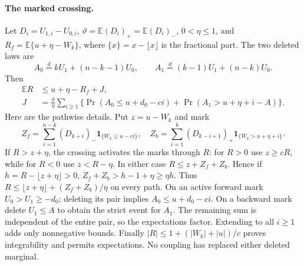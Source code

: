 \paragraph{The marked crossing.}
Let $D_i=U_{1,i}-U_{0,i}$, $\vartheta=\mathbb E(D_i)_+=\mathbb E(D_i)_-$,
$0<\eta\le1$, and $R_f=\mathbb E\{u+\eta-W_k\}$, where
$\{x\}=x-\lfloor x\rfloor$ is the fractional part. The two deleted laws are
\[
 A_0\overset{d}=kU_1+(n-k-1)U_0,\qquad
 A_1\overset{d}=(k-1)U_1+(n-k)U_0.
\]
Then
\begin{align}
 \mathbb ER&\le u+\eta-R_f+J,\label{j:local:shortloc:mark}\\
 J&=\frac{\vartheta}{\eta}\sum_{i\ge1}
 \{\Pr(A_0\le u+d_0-ci)+\Pr(A_1>u+\eta+i-A)\}.\nonumber
\end{align}
Here are the pathwise details. Put $z=u-W_k$ and mark
\[
 Z_f=\sum_{i=1}^{n-k}(D_{k+i})_-\mathbf1_{\{W_k\le u-ci\}},\quad
 Z_b=\sum_{i=1}^{k}(D_{k-i+1})_+\mathbf1_{\{W_k>u+\eta+i\}}.
\]
If $R>z+\eta$, the crossing activates the marks through $R$: for $R>0$
use $z\ge cR$, while for $R<0$ use $z<R-\eta$. In either case
$R\le z+Z_f+Z_b$. Hence if $h=R-\lfloor z+\eta\rfloor>0$,
$Z_f+Z_b>h-1+\eta\ge\eta h$. Thus
$R\le\lfloor z+\eta\rfloor+(Z_f+Z_b)/\eta$ on every path.
On an active forward mark $U_0>U_1\ge-d_0$; deleting its pair implies
$A_0\le u+d_0-ci$. On a backward mark delete $U_1\le A$ to obtain the
strict event for $A_1$. The remaining sum is independent of the entire
pair, so the expectations factor. Extending to all $i\ge1$ adds only
nonnegative bounds. Finally $|R|\le1+(|W_k|+|u|)/c$ proves integrability
and permits expectations. No coupling has replaced either deleted marginal.

